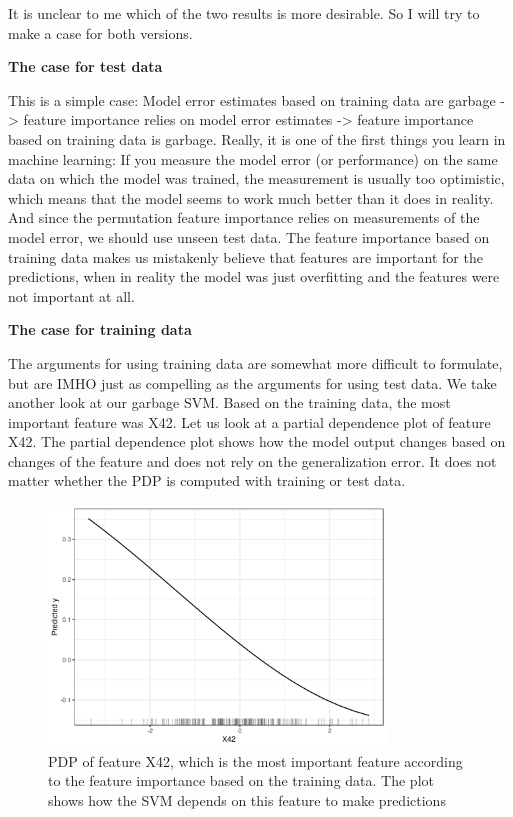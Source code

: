 \documentclass[
  11pt,
]{scrbook}
\begin{document}
It is unclear to me which of the two results is more desirable.
So I will try to make a case for both versions.

\textbf{The case for test data}

This is a simple case:
Model error estimates based on training data are garbage -\textgreater{} feature importance relies on model error estimates -\textgreater{} feature importance based on training data is garbage.
Really, it is one of the first things you learn in machine learning:
If you measure the model error (or performance) on the same data on which the model was trained, the measurement is usually too optimistic, which means that the model seems to work much better than it does in reality.
And since the permutation feature importance relies on measurements of the model error, we should use unseen test data.
The feature importance based on training data makes us mistakenly believe that features are important for the predictions, when in reality the model was just overfitting and the features were not important at all.

\textbf{The case for training data}

The arguments for using training data are somewhat more difficult to formulate, but are IMHO just as compelling as the arguments for using test data.
We take another look at our garbage SVM.
Based on the training data, the most important feature was X42.
Let us look at a partial dependence plot of feature X42.
The partial dependence plot shows how the model output changes based on changes of the feature and does not rely on the generalization error.
It does not matter whether the PDP is computed with training or test data.

\begin{figure}

{\centering \includegraphics[width=0.8\textwidth]{images/garbage-svm-pdp-1} 

}

\caption{PDP of feature X42, which is the most important feature according to the feature importance based on the training data. The plot shows how the SVM depends on this feature to make predictions}\label{fig:garbage-svm-pdp}
\end{figure}
\end{document}
